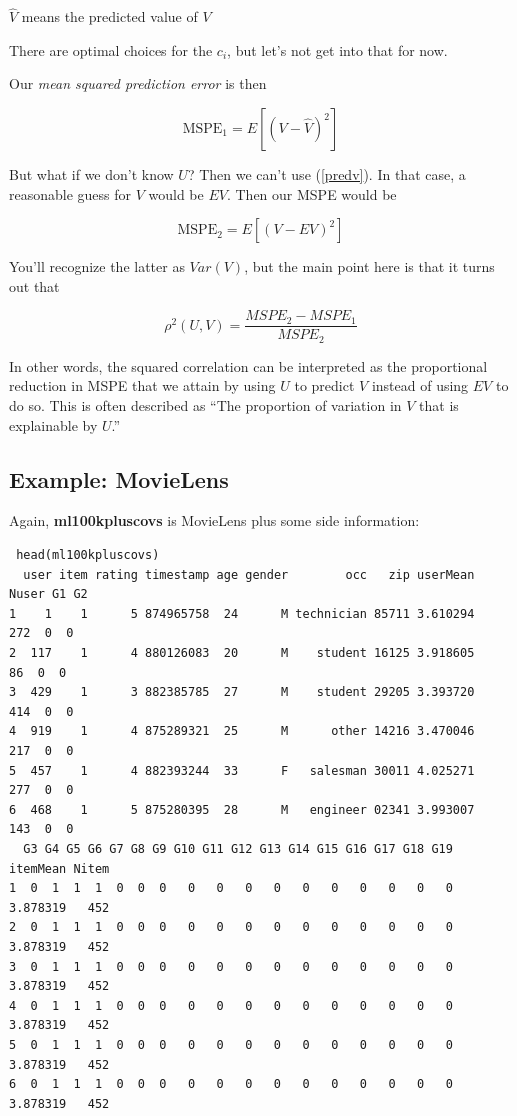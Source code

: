 $\widehat{V}$ means the predicted value of $V$

There are optimal choices for the $c_i$, but let's not get into that for
now.

Our \textit{mean squared prediction error} is then

\begin{equation}
\textrm{MSPE}_1 = E[(V - \widehat{V})^2]
\end{equation}

But what if we don't know $U$?  Then we can't use (\ref{predv}).  In
that case, a reasonable guess for $V$ would be $EV$.  Then our MSPE
would be

\begin{equation}
\textrm{MSPE}_2 = E[(V - EV)^2]
\end{equation}

You'll recognize the latter as $Var(V)$, but the main point here is that
it turns out that

\begin{equation}
\rho^2(U,V) =
\frac{MSPE_2 - MSPE_1}{MSPE_2}
\end{equation}

In other words, the squared correlation can be interpreted as the
proportional reduction in MSPE that we attain by using $U$ to predict
$V$ instead of using $EV$ to do so.  This is often described as ``The
proportion of variation in $V$ that is explainable by $U$.''

\subsection{Example:  MovieLens}

Again, \textbf{ml100kpluscovs} is MovieLens plus some side information:

\begin{lstlisting}
 head(ml100kpluscovs)
  user item rating timestamp age gender        occ   zip userMean Nuser G1 G2
1    1    1      5 874965758  24      M technician 85711 3.610294   272  0  0
2  117    1      4 880126083  20      M    student 16125 3.918605    86  0  0
3  429    1      3 882385785  27      M    student 29205 3.393720   414  0  0
4  919    1      4 875289321  25      M      other 14216 3.470046   217  0  0
5  457    1      4 882393244  33      F   salesman 30011 4.025271   277  0  0
6  468    1      5 875280395  28      M   engineer 02341 3.993007   143  0  0
  G3 G4 G5 G6 G7 G8 G9 G10 G11 G12 G13 G14 G15 G16 G17 G18 G19 itemMean Nitem
1  0  1  1  1  0  0  0   0   0   0   0   0   0   0   0   0   0 3.878319   452
2  0  1  1  1  0  0  0   0   0   0   0   0   0   0   0   0   0 3.878319   452
3  0  1  1  1  0  0  0   0   0   0   0   0   0   0   0   0   0 3.878319   452
4  0  1  1  1  0  0  0   0   0   0   0   0   0   0   0   0   0 3.878319   452
5  0  1  1  1  0  0  0   0   0   0   0   0   0   0   0   0   0 3.878319   452
6  0  1  1  1  0  0  0   0   0   0   0   0   0   0   0   0   0 3.878319   452
\end{lstlisting}

